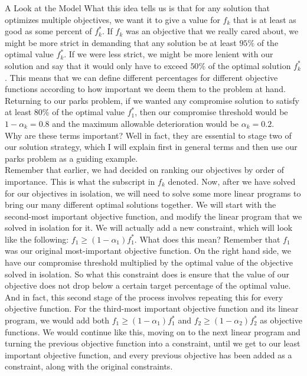 \documentclass[12pt]{pom_thesis}
\theoremstyle{definition}
\begin{document}
\begin{chapter}{A Look at the Model}
What this idea tells us is that for any solution that optimizes multiple objectives, we want it to give a value for $f_k$ that is at least as good as some percent of $f_k^*$. If $f_k$ was an objective that we really cared about, we might be more strict in demanding that any solution be at least $95\%$ of the optimal value $f_k^*$. If we were less strict, we might be more lenient with our solution and say that it would only have to exceed $50\%$ of the optimal solution $f_k^*$. This means that we can define different percentages for different objective functions according to how important we deem them to the problem at hand. Returning to our parks problem, if we wanted any compromise solution to satisfy at least $80\%$ of the optimal value $f_1^*$, then our compromise threshold would be $1 - \alpha_k = 0.8$ and the maximum allowable deterioration would be $\alpha_k =  0.2$. \\

Why are these terms important? Well in fact, they are essential to stage two of our solution strategy, which I will explain first in general terms and then use our parks problem as a guiding example. \\

Remember that earlier, we had decided on ranking our objectives by order of importance. This is what the subscript in $f_k$ denoted. Now, after we have solved for our objectives in isolation, we will need to solve some more linear programs to bring our many different optimal solutions together. We will start with the second-most important objective function, and modify the linear program that we solved in isolation for it. We will actually add a new constraint, which will look like the following: $f_1 \geq (1-\alpha_1)f_1^*$. What does this mean? Remember that $f_1$ was our original most-important objective function. On the right hand side, we have our compromise threshold multiplied by the optimal value of the objective solved in isolation. So what this constraint does is ensure that the value of our objective does not drop below a certain target percentage of the optimal value. And in fact, this second stage of the process involves repeating this for every objective function. For the third-most important objective function and its linear program, we would add both $f_1 \geq (1-\alpha_1)f_1^*$ and $f_2 \geq (1-\alpha_2)f_2^*$ as objective functions. We would continue like this, moving on to the next linear program and turning the previous objective function into a constraint, until we get to our least important objective function, and every previous objective has been added as a constraint, along with the original constraints.\\


\end{chapter}
\end{document}
